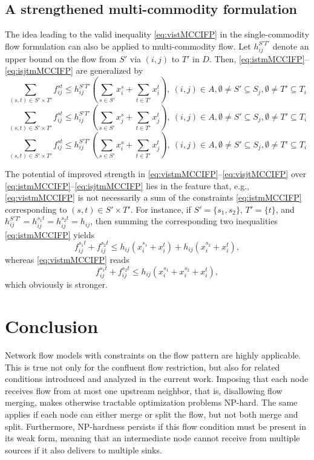 \documentclass[pdflatex,sn-mathphys-num]{sn-jnl}%
\theoremstyle{thmstyleone}%
\begin{document}
\subsection{A strengthened multi-commodity formulation} \label{sec:vim}
The idea leading to the valid inequality \eqref{eq:vistMCCIFP} in the single-commodity flow formulation can also be applied to multi-commodity flow.
Let $h_{ij}^{S'T'}$ denote an upper bound on the flow from $S'$ via $(i,j)$ to $T'$ in $D$.
Then, \eqref{eq:istmMCCIFP}--\eqref{eq:isjtmMCCIFP} are generalized by
\begin{equation}
     \sum_{(s,t)\in S'\times T'}f_{ij}^{st}\leq h_{ij}^{S'T'}\left(\sum_{s\in S'}x_i^s+\sum_{t\in T'}x_i^t\right),
     ~(i,j)\in A, \emptyset\neq S'\subseteq S_j, \emptyset\neq T'\subseteq T_i \label{eq:vistmMCCIFP}
\end{equation}
\begin{equation}
     \sum_{(s,t)\in S'\times T'}f_{ij}^{st}\leq h_{ij}^{S'T'}\left(\sum_{s\in S'}x_j^s+\sum_{t\in T'}x_j^t\right),
     ~(i,j)\in A, \emptyset\neq S'\subseteq S_j, \emptyset\neq T'\subseteq T_i \label{eq:vjtsmMCCIFP}
\end{equation}
\begin{equation}
     \sum_{(s,t)\in S'\times T'}f_{ij}^{st}\leq h_{ij}^{S'T'}\left(\sum_{s\in S'}x_i^s+\sum_{t\in T'}x_j^t\right),
     ~(i,j)\in A, \emptyset\neq S'\subseteq S_j, \emptyset\neq T'\subseteq T_i \label{eq:visjtMCCIFP}
\end{equation}

The potential of improved strength in \eqref{eq:vistmMCCIFP}--\eqref{eq:visjtMCCIFP} over \eqref{eq:istmMCCIFP}--\eqref{eq:isjtmMCCIFP} lies in the feature that, e.g.,
\eqref{eq:vistmMCCIFP} is not necessarily a sum of the constraints \eqref{eq:istmMCCIFP} corresponding to $(s,t)\in S'\times T'$.
For instance, if $S'=\{s_1,s_2\}$, $T'=\{t\}$, and $h_{ij}^{S'T'}=h_{ij}^{s_1t}=h_{ij}^{s_2t}=h_{ij}$, then summing the corresponding two inequalities \eqref{eq:istmMCCIFP} yields
\[
f_{ij}^{s_1t}+f_{ij}^{s_2t}\leq h_{ij}(x_i^{s_1}+x_i^t) + h_{ij}(x_i^{s_2}+x_i^t),
\]
\noindent
whereas \eqref{eq:vistmMCCIFP} reads
\[
f_{ij}^{s_1t}+f_{ij}^{s_2t}\leq h_{ij}(x_i^{s_1}+x_i^{s_2}+x_i^t),
\]
\noindent
which obviously is stronger.

\section{Conclusion} \label{sec:conc}
Network flow models with constraints on the flow pattern are highly applicable.
This is true not only for the confluent flow restriction, but also for related conditions introduced and analyzed in the current work.
Imposing that each node receives flow from at most one upstream neighbor, that is, disallowing flow merging, makes otherwise tractable optimization problems NP-hard.
The same applies if each node can either merge or split the flow, but not both merge and split.
Furthermore, NP-hardness persists if this flow condition must be present in its weak form, meaning that an intermediate node cannot receive from multiple sources if it also delivers to multiple sinks.
\end{document}
